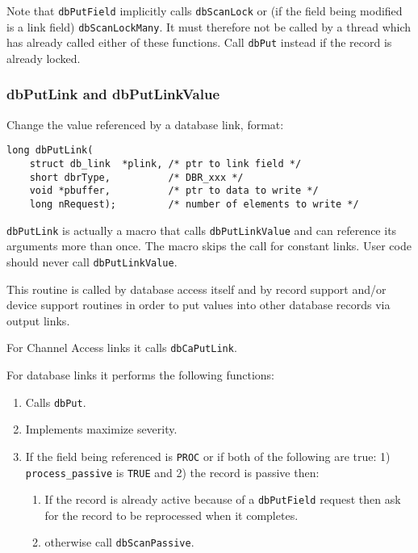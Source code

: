 Note that \verb|dbPutField| implicitly calls \verb|dbScanLock| or (if the field being modified is a link field) \verb|dbScanLockMany|.
It must therefore not be called by a thread which has already called either of these functions.
Call \verb|dbPut| instead if the record is already locked.

\subsubsection{dbPutLink and dbPutLinkValue}

Change the value referenced by a database link, format:

\begin{verbatim}
long dbPutLink(
    struct db_link  *plink, /* ptr to link field */
    short dbrType,          /* DBR_xxx */
    void *pbuffer,          /* ptr to data to write */
    long nRequest);         /* number of elements to write */
\end{verbatim}

\verb|dbPutLink| is actually a macro that calls \verb|dbPutLinkValue| and can reference its arguments more than once.
The macro skips the call for constant links.
User code should never call \verb|dbPutLinkValue|.

This routine is called by database access itself and by record support and/or device support routines in order to put values into other database records via output links.

For Channel Access links it calls \verb|dbCaPutLink|.

For database links it performs the following functions:

\begin{enumerate}

\item Calls \verb|dbPut|.

\item Implements maximize severity.

\item If the field being referenced is \verb|PROC| or if both of the following are true: 1) \verb|process_passive| is \verb|TRUE| and 2) the record is passive then:

\begin{enumerate}

\item If the record is already active because of a \verb|dbPutField| request then ask for the record to be reprocessed when it completes.

\item otherwise call \verb|dbScanPassive|.

\end{enumerate}
\end{enumerate}

